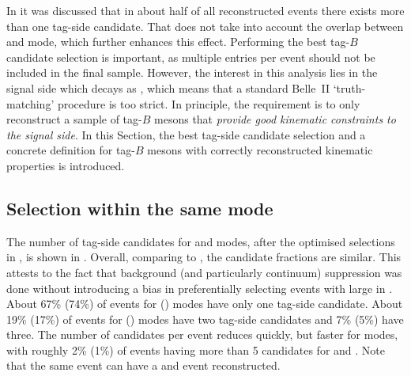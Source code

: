 In  it was discussed that in about half of all reconstructed events there exists more than one tag-side candidate.
That does not take into account the overlap between \feiBp and \feiBz mode, which further enhances this effect.
Performing the best tag-$B$ candidate selection is important, as multiple entries per event should not be included in the final sample.
However, the interest in this analysis lies in the signal side which decays as \BtoXsgamma, which means that a standard Belle~II `truth-matching' procedure is too strict.
In principle, the requirement is to only reconstruct a sample of tag-$B$ mesons that \textit{provide good kinematic constraints to the signal side}.
In this Section, the best tag-side candidate selection and
a concrete definition for tag-$B$ mesons with correctly reconstructed kinematic properties is introduced.

\subsection{Selection within the same \texorpdfstring{\FEI}{FEI} mode}\label{sec:select_tag_between_modes}

The number of tag-side candidates for \feiBp and \feiBz modes, after the optimised selections in ,
is shown in .
Overall, comparing to , the candidate fractions are similar.
This attests to the fact that background (and particularly continuum) suppression was done without introducing a bias in preferentially selecting events with large \feiProb in .
About 67\% (74\%) of events for \feiBp (\feiBz) modes have only one tag-side candidate.
About 19\% (17\%) of events for \feiBp (\feiBz) modes have two tag-side candidates and 7\% (5\%) have three.
The number of candidates per event reduces quickly, but faster for \Bz modes, 
with roughly 2\% (1\%) of events having more than 5 candidates for \Bp and \Bz.
Note that the same event can have a \Bp and \Bz event reconstructed.

